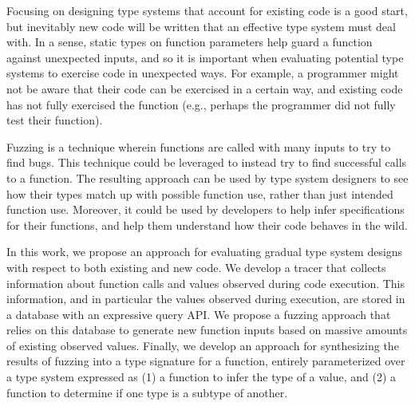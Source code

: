 \documentclass[sigplan,anonymous,review]{acmart}
\begin{document}
Focusing on designing type systems that account for existing code is a good start, but inevitably new code will be written that an effective type system must deal with.
In a sense, static types on function parameters help guard a function against unexpected inputs, and so it is important when evaluating potential type systems to exercise code in unexpected ways. 
For example, a programmer might not be aware that their code can be exercised in a certain way, and existing code has not fully exercised the function (e.g., perhaps the programmer did not fully test their function).

Fuzzing is a technique wherein functions are called with many inputs to try to find bugs.
This technique could be leveraged to instead try to find successful calls to a function.
The resulting approach can be used by type system designers to see how their types match up with possible function use, rather than just intended function use.
Moreover, it could be used by developers to help infer specifications for their functions, and help them understand how their code behaves in the wild.

In this work, we propose an approach for evaluating gradual type system designs with respect to both existing and new code.
We develop a tracer that collects information about function calls and values observed during code execution.
This information, and in particular the values observed during execution, are stored in a database with an expressive query API.
We propose a fuzzing approach that relies on this database to generate new function inputs based on massive amounts of existing observed values.
Finally, we develop an approach for synthesizing the results of fuzzing into a type signature for a function, entirely parameterized over a type system expressed as (1) a function to infer the type of a value, and (2) a function to determine if one type is a subtype of another.
\end{document}
